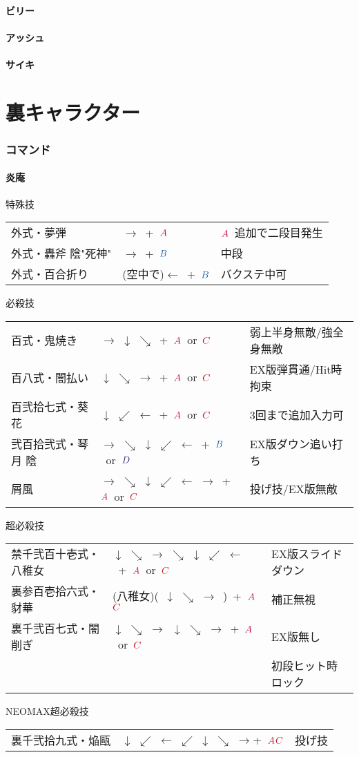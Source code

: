 \documentclass[a4j,11pt]{jarticle}
\def\A{$\textcolor{Acolor}{A}$}
\def\C{$\textcolor{Ccolor}{C}$}
\def\B{$\textcolor{Bcolor}{B}$}
\def\D{$\textcolor{Dcolor}{D}$}
\def\hado{$\downarrow$ $\searrow$ $\rightarrow$}%
\def\tatsu{$\downarrow$ $\swarrow$ $\leftarrow$}%
\def\syoryu{$\rightarrow$ $\downarrow$ $\searrow$}%
\def\gyakuyoga{$\rightarrow$ $\searrow$ $\downarrow$ $\swarrow$ $\leftarrow$}%
\def\tenti{$\rightarrow$ $\searrow$ $\downarrow$ $\swarrow$ $\leftarrow$ $\rightarrow$}%
\def\ryuko{$\downarrow$ $\searrow$ $\rightarrow$ $\searrow$ $\downarrow$ $\swarrow$ $\leftarrow$}%
\def\orochi{$\downarrow$ $\swarrow$ $\leftarrow$ $\swarrow$ $\downarrow$ $\searrow$ $\rightarrow$}%
\begin{document}
\subsection{ビリー}
\subsection{アッシュ}
\subsection{サイキ}
\newpage
\part{裏キャラクター}%
\section{コマンド}
\subsection{炎庵}
\begin{itembox}[l]{特殊技}
\begin{tabular}{lll}
外式・夢弾&$\rightarrow$\ +\ \A&\A\ 追加で二段目発生\\
外式・轟斧 陰"死神"&$\rightarrow$\ +\ \B&中段\\%
外式・百合折り&(空中で)$\leftarrow$\ +\ \B&バクステ中可%
\end{tabular}
\end{itembox}
\begin{itembox}[l]{必殺技}
\begin{tabular}{lll}
百式・鬼焼き&\syoryu\ +\ \A\ or\ \C&弱上半身無敵/強全身無敵\\%
百八式・闇払い&\hado\ +\ \A\ or\ \C&EX版弾貫通/Hit時拘束\\%
百弐拾七式・葵花&\tatsu\ +\ \A\ or\ \C&3回まで追加入力可\\%
弐百拾弐式・琴月 陰&\gyakuyoga\ +\ \B\ or\ \D&EX版ダウン追い打ち\\%
屑風&\tenti\ +\ \A\ or\ \C&投げ技/EX版無敵%
\end{tabular}
\end{itembox}
\begin{itembox}[l]{超必殺技}
\begin{tabular}{lll}
禁千弐百十壱式・八稚女&\ryuko\ +\ \A\ or\ \C&EX版スライドダウン\\%
裏参百壱拾六式・豺華&(八稚女)(\ \hado\ )\times 4\ +\ \A\C&補正無視\\
裏千弐百七式・闇削ぎ&\hado\ \hado\ +\ \A\ or\ \C&EX版無し\\
&&初段ヒット時ロック%
\end{tabular}
\end{itembox}
\begin{itembox}[l]{NEOMAX超必殺技}
\begin{tabular}{lll}
裏千弐拾九式・焔甌&\orochi +\ \A\C&投げ技%
\end{tabular}
\end{itembox}
\newpage
\end{document}
